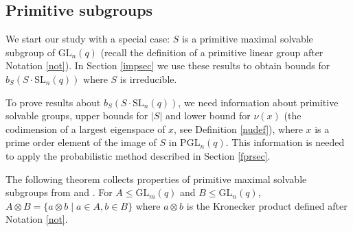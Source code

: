\documentclass[a4paper,reqno,11pt]{amsart}
\theoremstyle{definition}
\theoremstyle{remark}
\numberwithin{equation}{section}
\newcommand{\SL}{{\mathrm{SL}}}
\newcommand{\GL}{{\mathrm{GL}}}
\newcommand{\PGL}{{\mathrm{PGL}}}
\begin{document}
\subsection{Primitive subgroups} \label{sec31}


    We start our study with a special case:  $S$ is a primitive maximal solvable subgroup  of $\GL_n(q)$ (recall the definition of a primitive linear group after Notation \ref{not}). In Section \ref{impsec} we use these results to obtain bounds for $b_S(S \cdot \SL_n(q))$ where $S$ is irreducible.  

To prove results about $b_S(S \cdot \SL_n(q))$, we need  information about  primitive solvable groups, upper bounds for $|S|$ and lower bound for $\nu(x)$ (the codimension of a largest eigenspace of $x$, see Definition \ref{nudef}), where $x$ is a prime order element of the image of $S$ in $\PGL_n(q).$  This information is needed to apply the probabilistic method described in Section \ref{fprsec}.

The following theorem collects properties of primitive maximal solvable subgroups from \cite[\S \S 19 -- 20]{sup} and \cite[\S 2.5]{short}.  For $A \le \GL_m(q)$ and $B \le \GL_n(q)$, $A \otimes B = \{a \otimes b \mid a \in A, b \in B\}$ where $a \otimes b$ is the Kronecker product defined  after Notation \ref{not}.  
\end{document}

